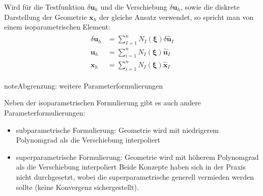 \documentclass[letterpaper,10pt,german]{jupyterBook}
\begin{document}
\sphinxAtStartPar
Wird für die Testfunktion \(\delta \bm{u}_h\) und die Verschiebung \(\delta\bm{u}_h\), sowie die diskrete Darstellung der Geometrie \(\bm{x}_h\) der gleiche Ansatz verwendet, so spricht man von einem isoparametrischen Element:
\begin{equation}\label{equation:chapters/chapter3/isoparametrischeFEM:isoparametric}
\begin{split}\begin{align}
  \delta \bm{u}_h &= \sum_{I=1}^{n} N_I(\bm{\xi}) \delta \hat{\bm{u}}_I \\
  \bm{u}_h &= \sum_{i=1}^{n} N_I(\bm{\xi}) \hat{\bm{u}}_I \\
  \bm{x}_h &= \sum_{i=1}^{n} N_I(\bm{\xi}) \hat{\bm{x}}_I
\end{align}\end{split}
\end{equation}
\begin{sphinxadmonition}{note}{Abgrenzung: weitere Parameterformulierungen}

\sphinxAtStartPar
Neben der isoparametrischen Formulierung gibt es auch andere Parameterformulierungen:
\begin{itemize}
\item {} 
\sphinxAtStartPar
subparametrische Formulierung: Geometrie wird mit niedrigerem Polynomgrad als die Verschiebung interpoliert

\item {} 
\sphinxAtStartPar
superparametrische Formulierung: Geometrie wird mit höherem Polynomgrad als die Verschiebung interpoliert
Beide Konzepte haben sich in der Praxis nicht durchgesetzt, wobei die superparametrische generell vermieden werden sollte (keine Konvergenz sichergestellt).

\end{itemize}
\end{sphinxadmonition}
\end{document}
